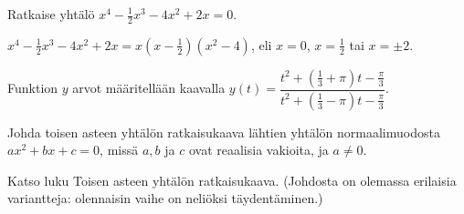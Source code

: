 \begin{multicols}{2}
\begin{tehtava} %
Ratkaise yhtälö $x^4-\frac{1}{2}x^3-4x^2+2x=0$.
	\begin{vastaus}	
$x^4-\frac{1}{2}x^3-4x^2+2x=x(x-\frac{1}{2})(x^2-4)$, eli $x=0$, $x=\frac{1}{2}$ tai $x=\pm 2$.
	\end{vastaus}
\end{tehtava}

\begin{tehtava}
Funktion $y$ arvot määritellään kaavalla $y(t)=\dfrac{t^2+\left(\frac{1}{3}+\pi\right)t-\frac{\pi}{3}}{t^2+\left(\frac{1}{3}-\pi\right)t-\frac{\pi}{3}}$.
		\begin{vastaus}
		\end{vastaus}
\end{tehtava}

\begin{tehtava}
Johda toisen asteen yhtälön ratkaisukaava lähtien yhtälön normaalimuodosta $ax^2+bx+c=0$, missä $a, b$ ja $c$ ovat reaalisia vakioita, ja $a \neq 0$.
	\begin{vastaus}
	Katso luku Toisen asteen yhtälön ratkaisukaava. (Johdosta on olemassa erilaisia variantteja: olennaisin vaihe on neliöksi täydentäminen.)
	\end{vastaus}
\end{tehtava}

\end{multicols}

\newpage


